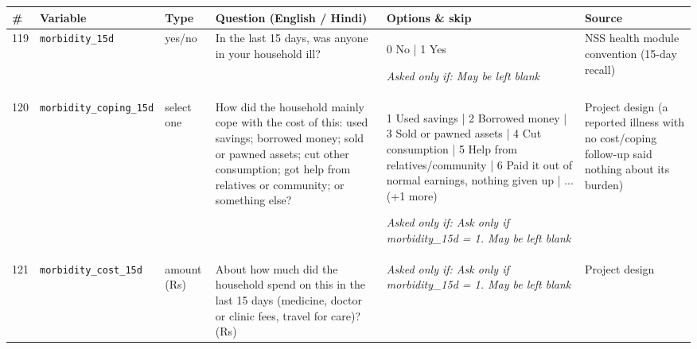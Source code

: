 \documentclass[9pt,a4paper,landscape]{article}
\begin{document}
\begin{longtable}{@{}p{0.5cm}p{3.3cm}p{1.7cm}p{7.3cm}p{5.6cm}p{5.4cm}@{}}
\toprule \footnotesize\textbf{\#} & \footnotesize\textbf{Variable} & \footnotesize\textbf{Type} & \footnotesize\textbf{Question (English / Hindi)} & \footnotesize\textbf{Options {\&} skip} & \footnotesize\textbf{Source}\\ \midrule
\endhead
\footnotesize 119 & \footnotesize\texttt{morbidity\_15d} & \scriptsize yes/no & \footnotesize In the last 15 days, was anyone in your household ill?\par\vspace{1pt}{\footnotesize\color{hdr}{\hifont पिछले 15 दिनों में क्या आपके घर में कोई बीमार पड़ा?}} & \scriptsize 0 No | 1 Yes\par\vspace{1pt}\textit{Asked only if: May be left blank} & \scriptsize NSS health module convention (15-day recall)\\
\footnotesize 120 & \footnotesize\texttt{morbidity\_coping\_15d} & \scriptsize select one & \footnotesize How did the household mainly cope with the cost of this: used savings; borrowed money; sold or pawned assets; cut other consumption; got help from relatives or community; or something else?\par\vspace{1pt}{\footnotesize\color{hdr}{\hifont इसका ख़र्च आपके घर ने मुख्य रूप से कैसे उठाया: जमा पैसे से; उधार लेकर; कुछ बेचकर या गिरवी रखकर; बाकी ख़र्च घटाकर; रिश्तेदारों या गाँव वालों की मदद से; या किसी और तरह?}} & \scriptsize 1 Used savings | 2 Borrowed money | 3 Sold or pawned assets | 4 Cut consumption | 5 Help from relatives/community | 6 Paid it out of normal earnings, nothing given up | ... (+1 more)\par\vspace{1pt}\textit{Asked only if: Ask only if morbidity\_15d = 1. May be left blank} & \scriptsize Project design (a reported illness with no cost/coping follow-up said nothing about its burden)\\
\footnotesize 121 & \footnotesize\texttt{morbidity\_cost\_15d} & \scriptsize amount (Rs) & \footnotesize About how much did the household spend on this in the last 15 days (medicine, doctor or clinic fees, travel for care)? (Rs)\par\vspace{1pt}{\footnotesize\color{hdr}{\hifont पिछले 15 दिनों में इस पर घर का लगभग कितना ख़र्च हुआ (दवाई, डॉक्टर या क्लीनिक की फ़ीस, आने-जाने का ख़र्च)? (रुपये)}} & \scriptsize \textit{Asked only if: Ask only if morbidity\_15d = 1. May be left blank} & \scriptsize Project design\\

\end{longtable}
\end{document}
